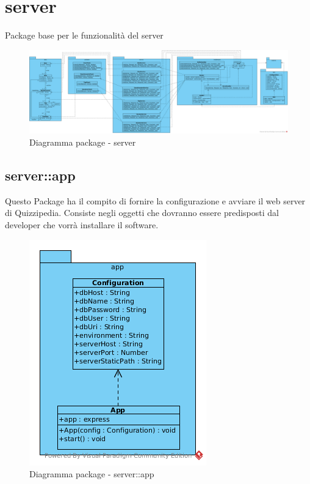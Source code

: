 \section{server}
Package base per le funzionalità del server\begin{center}
		\begin{figure}[H]
			\centering \includegraphics[scale=4, max width=\textwidth, max height=\myheight]{../img/diagrammiClassi/server.png}
			\caption{Diagramma package - server}
		\end{figure}
	\end{center}\subsection{server::app}
Questo Package ha il compito di fornire la configurazione e avviare il web server di Quizzipedia. Consiste negli oggetti che dovranno essere predisposti dal developer che
vorrà installare il software.\begin{center}
		\begin{figure}[H]
			\centering \includegraphics[scale=4, max width=\textwidth, max height=\myheight]{../img/diagrammiClassi/server/app.png}
			\caption{Diagramma package - server::app}
		\end{figure}
	\end{center}\hypertarget{server::app::App}{}

